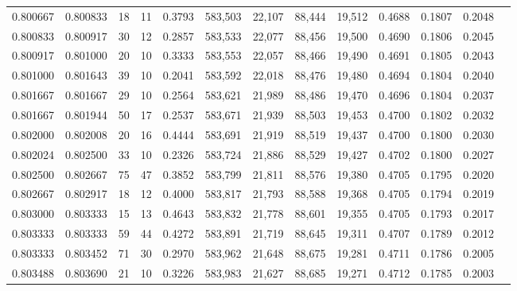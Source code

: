 \begin{tabular}{rrrrrrrrrrrrr}
0.800667 & 0.800833 &    18 &  11 &                                     0.3793 & 583,503 &  22,107 &  88,444 &  19,512 & 0.4688 & 0.1807 & 0.2048 \\
0.800833 & 0.800917 &    30 &  12 &                                     0.2857 & 583,533 &  22,077 &  88,456 &  19,500 & 0.4690 & 0.1806 & 0.2045 \\
0.800917 & 0.801000 &    20 &  10 &                                     0.3333 & 583,553 &  22,057 &  88,466 &  19,490 & 0.4691 & 0.1805 & 0.2043 \\
0.801000 & 0.801643 &    39 &  10 &                                     0.2041 & 583,592 &  22,018 &  88,476 &  19,480 & 0.4694 & 0.1804 & 0.2040 \\
0.801667 & 0.801667 &    29 &  10 &                                     0.2564 & 583,621 &  21,989 &  88,486 &  19,470 & 0.4696 & 0.1804 & 0.2037 \\
0.801667 & 0.801944 &    50 &  17 &                                     0.2537 & 583,671 &  21,939 &  88,503 &  19,453 & 0.4700 & 0.1802 & 0.2032 \\
0.802000 & 0.802008 &    20 &  16 &                                     0.4444 & 583,691 &  21,919 &  88,519 &  19,437 & 0.4700 & 0.1800 & 0.2030 \\
0.802024 & 0.802500 &    33 &  10 &                                     0.2326 & 583,724 &  21,886 &  88,529 &  19,427 & 0.4702 & 0.1800 & 0.2027 \\
0.802500 & 0.802667 &    75 &  47 &                                     0.3852 & 583,799 &  21,811 &  88,576 &  19,380 & 0.4705 & 0.1795 & 0.2020 \\
0.802667 & 0.802917 &    18 &  12 &                                     0.4000 & 583,817 &  21,793 &  88,588 &  19,368 & 0.4705 & 0.1794 & 0.2019 \\
0.803000 & 0.803333 &    15 &  13 &                                     0.4643 & 583,832 &  21,778 &  88,601 &  19,355 & 0.4705 & 0.1793 & 0.2017 \\
0.803333 & 0.803333 &    59 &  44 &                                     0.4272 & 583,891 &  21,719 &  88,645 &  19,311 & 0.4707 & 0.1789 & 0.2012 \\
0.803333 & 0.803452 &    71 &  30 &                                     0.2970 & 583,962 &  21,648 &  88,675 &  19,281 & 0.4711 & 0.1786 & 0.2005 \\
0.803488 & 0.803690 &    21 &  10 &                                     0.3226 & 583,983 &  21,627 &  88,685 &  19,271 & 0.4712 & 0.1785 & 0.2003 \\

\end{tabular}

